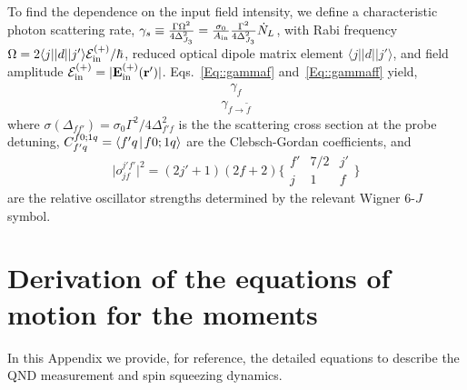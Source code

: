 \documentclass[pra,twocolumn,floatfix,superscriptaddress]{revtex4-1} %
\def\br{\mathbf{r}}
\def\bra#1{\langle{#1}\rvert}%
\def\ket#1{\lvert{#1}\rangle}%
\def\Braket#1#2{\mathinner{\langle{#1}\! \mid\! {#2} \rangle}}
\newcommand{\mbf}[1]{\mathbf{#1}}
\newcommand{\inp}{{\rm in}}
\begin{document}
\begin{appendix}
To find the dependence on the input field intensity, we define a characteristic photon scattering rate, $\gamma_s \equiv \frac{\Gamma\Omega^2}{4\Delta_{J_3}^2}= \frac{\sigma_0}{A_{\rm in}}\frac{\Gamma^2}{4 \Delta_{J_3}^2} \dot{N}_L $, with Rabi frequency $ \Omega=2\bra{j}|d|\ket{j'}\mathcal{E}^{(+)}_{\rm in}/\hbar $, reduced optical dipole matrix element $\bra{j}|d|\ket{j'}$, and field amplitude $ \mathcal{E}^{(+)}_{\rm in}=|\mathbf{E}_{\rm in}^{(+)}(\br')| $.
Eqs.~\eqref{Eq::gammaf} and~\eqref{Eq::gammaff} yield,
\begin{subequations}
	\begin{align}
		\gamma_f 
	\end{align}
\end{subequations}
	\begin{align}
		\gamma_{f \rightarrow \tilde{f}}
	\end{align}
where $ \sigma (\Delta_{ff'} )  = \sigma_0 \Gamma^2/4\Delta^2_{f' f}$ is the the scattering cross section at the probe detuning, $ C_{f'q}^{f0;1 q}=\Braket{f'q}{f0;1q}$ are the Clebsch-Gordan coefficients, and
\begin{equation}
\big| o_{jf}^{j'f'} \big|^2=(2j'+1)(2f+2) \bigg\{
\begin{array}{ccc}
f' & 7/2 & j' \\
 j & 1 & f
 \end{array}
 \bigg\}
\end{equation}
are the relative oscillator strengths determined by the relevant Wigner 6-$J$ symbol.

\section{Derivation of the equations of motion for the moments} \label{Appendix::OpticalPumping}

In this Appendix we provide, for reference, the detailed equations to describe the QND measurement and spin squeezing dynamics.


\end{appendix}
\end{document}

